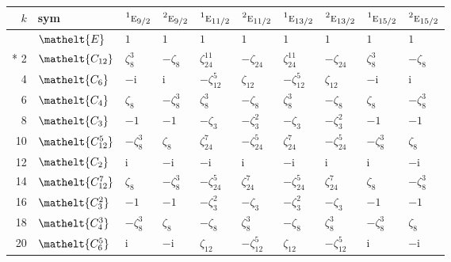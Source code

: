\documentclass[10pt,a4paper]{article}
\numberwithin{equation}{section}
\newcommand{\eltfont}[1]{{\let\sigma\eltsigma\mathelt{#1}}}
\newcommand{\irr}[1]{\text{\normalfont\scshape #1}}
\newcommand{\conjpair}[1]{{}^{#1}}
\newcommand{\cls}[1]{\eltfont{#1}}
\newcommand{\iunit}{\mathrm{i}}
\newcommand{\rootunity}[1]{\zeta_{#1}}
\begin{document}
{\small\setlength{\tabcolsep}{4pt}
\begin{longtable}{@{}rlllllllll@{}}\toprule
$k$ & sym & $\conjpair{1}\irr{e}_{9/2}$ & $\conjpair{2}\irr{e}_{9/2}$ & $\conjpair{1}\irr{e}_{11/2}$ & $\conjpair{2}\irr{e}_{11/2}$ & $\conjpair{1}\irr{e}_{13/2}$ & $\conjpair{2}\irr{e}_{13/2}$ & $\conjpair{1}\irr{e}_{15/2}$ & $\conjpair{2}\irr{e}_{15/2}$\\\midrule\endhead
\bottomrule\endfoot\endlastfoot
0 & $\cls{E}$ & $1$ & $1$ & $1$ & $1$ & $1$ & $1$ & $1$ & $1$\\*
2 & $\cls{C_{12}}$ & $\rootunity{8}^{3}$ & $-\rootunity{8}$ & $\rootunity{24}^{11}$ & $-\rootunity{24}$ & $\rootunity{24}^{11}$ & $-\rootunity{24}$ & $\rootunity{8}^{3}$ & $-\rootunity{8}$\\
4 & $\cls{C_{6}}$ & $-\iunit{}$ & $\iunit{}$ & $-\rootunity{12}^{5}$ & $\rootunity{12}$ & $-\rootunity{12}^{5}$ & $\rootunity{12}$ & $-\iunit{}$ & $\iunit{}$\\
6 & $\cls{C_{4}}$ & $\rootunity{8}$ & $-\rootunity{8}^{3}$ & $\rootunity{8}^{3}$ & $-\rootunity{8}$ & $\rootunity{8}^{3}$ & $-\rootunity{8}$ & $\rootunity{8}$ & $-\rootunity{8}^{3}$\\
8 & $\cls{C_{3}}$ & $-1$ & $-1$ & $-\rootunity{3}$ & $-\rootunity{3}^{2}$ & $-\rootunity{3}$ & $-\rootunity{3}^{2}$ & $-1$ & $-1$\\
10 & $\cls{C_{12}^{5}}$ & $-\rootunity{8}^{3}$ & $\rootunity{8}$ & $\rootunity{24}^{7}$ & $-\rootunity{24}^{5}$ & $\rootunity{24}^{7}$ & $-\rootunity{24}^{5}$ & $-\rootunity{8}^{3}$ & $\rootunity{8}$\\
12 & $\cls{C_{2}}$ & $\iunit{}$ & $-\iunit{}$ & $-\iunit{}$ & $\iunit{}$ & $-\iunit{}$ & $\iunit{}$ & $\iunit{}$ & $-\iunit{}$\\
14 & $\cls{C_{12}^{7}}$ & $\rootunity{8}$ & $-\rootunity{8}^{3}$ & $-\rootunity{24}^{5}$ & $\rootunity{24}^{7}$ & $-\rootunity{24}^{5}$ & $\rootunity{24}^{7}$ & $\rootunity{8}$ & $-\rootunity{8}^{3}$\\
16 & $\cls{C_{3}^{2}}$ & $-1$ & $-1$ & $-\rootunity{3}^{2}$ & $-\rootunity{3}$ & $-\rootunity{3}^{2}$ & $-\rootunity{3}$ & $-1$ & $-1$\\
18 & $\cls{C_{4}^{3}}$ & $-\rootunity{8}^{3}$ & $\rootunity{8}$ & $-\rootunity{8}$ & $\rootunity{8}^{3}$ & $-\rootunity{8}$ & $\rootunity{8}^{3}$ & $-\rootunity{8}^{3}$ & $\rootunity{8}$\\
20 & $\cls{C_{6}^{5}}$ & $\iunit{}$ & $-\iunit{}$ & $\rootunity{12}$ & $-\rootunity{12}^{5}$ & $\rootunity{12}$ & $-\rootunity{12}^{5}$ & $\iunit{}$ & $-\iunit{}$\\

\end{longtable}}
\end{document}
